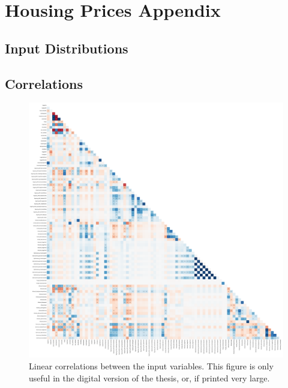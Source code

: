 
\chapter{Housing Prices Appendix}

\section{Input Distributions}



\FloatBarrier
\section{Correlations}

\begin{figure}[h!]
  \centerfloat
  \includegraphics[draft=false, width=1.1\textwidth, trim=10 10 10 10, clip]{figures/housing/correlations_all.pdf}
  \caption[Linear Correlations]
          {Linear correlations between the input variables. This figure is only useful in the digital version of the thesis, or, if printed very large.}
  \label{fig:h:correlations_all_lin}
\end{figure}


